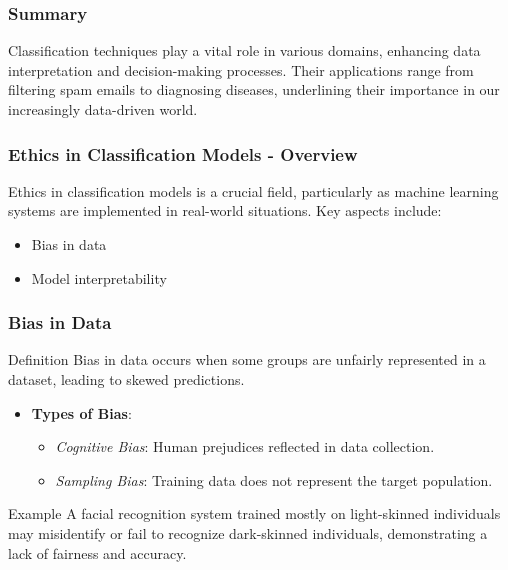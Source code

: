 \documentclass[aspectratio=169]{beamer}
\begin{document}
\begin{frame}
    \frametitle{Summary}
    Classification techniques play a vital role in various domains, enhancing data interpretation and decision-making processes. Their applications range from filtering spam emails to diagnosing diseases, underlining their importance in our increasingly data-driven world.
\end{frame}

\begin{frame}[fragile]
  \frametitle{Ethics in Classification Models - Overview}
  Ethics in classification models is a crucial field, particularly as machine learning systems are implemented in real-world situations. Key aspects include:
  \begin{itemize}
    \item Bias in data
    \item Model interpretability
  \end{itemize}
\end{frame}

\begin{frame}[fragile]
  \frametitle{Bias in Data}
  \begin{block}{Definition}
    Bias in data occurs when some groups are unfairly represented in a dataset, leading to skewed predictions.
  \end{block}
  
  \begin{itemize}
    \item \textbf{Types of Bias}:
    \begin{itemize}
      \item \textit{Cognitive Bias}: Human prejudices reflected in data collection.
      \item \textit{Sampling Bias}: Training data does not represent the target population.
    \end{itemize}
  \end{itemize}
  
  \begin{block}{Example}
    A facial recognition system trained mostly on light-skinned individuals may misidentify or fail to recognize dark-skinned individuals, demonstrating a lack of fairness and accuracy.
  \end{block}
\end{frame}
\end{document}
